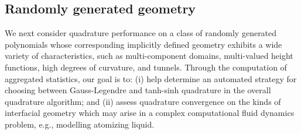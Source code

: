 \documentclass[onefignum,onetabnum,onealgnum,oneeqnum]{siamart190516}
\begin{document}
\subsection{Randomly generated geometry}
\label{sec:random}

We next consider quadrature performance on a class of randomly generated polynomials whose corresponding implicitly defined geometry exhibits a wide variety of characteristics, such as multi-component domains, multi-valued height functions, high degrees of curvature, and tunnels. Through the computation of aggregated statistics, our goal is to: (i) help determine an automated strategy for choosing between Gauss-Legendre and tanh-sinh quadrature in the overall quadrature algorithm; and (ii) assess quadrature convergence on the kinds of interfacial geometry which may arise in a complex computational fluid dynamics problem, e.g., modelling atomizing liquid.
\end{document}
